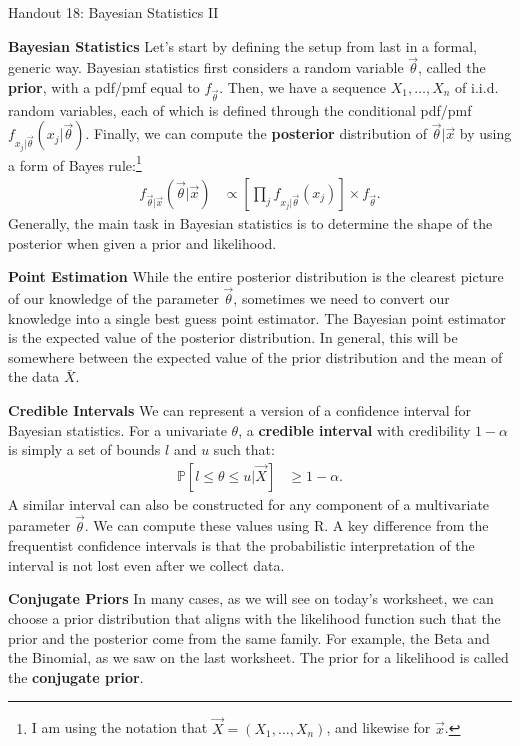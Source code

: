 \documentclass{tufte-handout}
\begin{document}
\justify

{\LARGE Handout 18: Bayesian Statistics II}

\vspace*{18pt}

\noindent
\textbf{Bayesian Statistics} Let's start by defining the setup
from last in a formal, generic way. Bayesian statistics first
considers a random variable $\vec{\theta}$, called the \textbf{prior},
with a pdf/pmf equal to $f_{\vec{\theta}}$. Then, we have a sequence
$X_1, \ldots, X_n$ of i.i.d. random variables, each of which is defined
through the conditional pdf/pmf $f_{x_j|\vec{\theta}}(x_j|\vec{\theta})$.
Finally, we can compute the \textbf{posterior} distribution of
$\vec{\theta} | \vec{x}$ by using a form of Bayes rule:\footnote{
  I am using the notation that $\vec{X} = (X_1, \ldots, X_n)$, and
  likewise for $\vec{x}$.
}
\begin{align*}
f_{\vec{\theta} | \vec{x}}(\vec{\theta} | \vec{x}) &\propto
\left[ \prod_j f_{x_j|\vec{\theta}}(x_j) \right] \times f_{\vec{\theta}}.
\end{align*}
Generally, the main task in Bayesian statistics is to determine the
shape of the posterior when given a prior and likelihood.

\vspace*{18pt}

\noindent
\textbf{Point Estimation}  
While the entire posterior distribution is the clearest picture of our
knowledge of the parameter $\vec{\theta}$, sometimes we need to convert our
knowledge into a single best guess point estimator. The Bayesian point
estimator is the expected value of the posterior distribution. In general,
this will be somewhere between the expected value of the prior distribution
and the mean of the data $\bar{X}$.

\vspace*{18pt}

\noindent
\textbf{Credible Intervals}  
We can represent a version of a confidence interval for Bayesian statistics.
For a univariate $\theta$, a \textbf{credible interval} with credibility
$1-\alpha$ is simply a set of bounds $l$ and $u$ such that: 
\begin{align*}
\mathbb{P}[l \leq \theta \leq u | \vec{X}] &\geq 1 - \alpha.
\end{align*}
A similar interval can also be constructed for any component of a multivariate
parameter $\vec{\theta}$. We can compute these values using R. A key difference
from the frequentist confidence intervals is that the probabilistic interpretation
of the interval is not lost even after we collect data.

\vspace*{18pt}

\noindent
\textbf{Conjugate Priors}
In many cases, as we will see on today's worksheet, we can choose a prior
distribution that aligns with the likelihood function such that the prior
and the posterior come from the same family. For example, the Beta and the
Binomial, as we saw on the last worksheet. The prior for a likelihood is 
called the \textbf{conjugate prior}.
\end{document}
